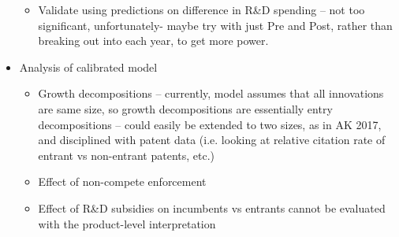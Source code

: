\documentclass[11pt,english]{article}
\theoremstyle{remark}
\begin{document}
\begin{itemize}
\begin{itemize}
		\item Validate using predictions on difference in R\&D spending -- not too significant, unfortunately- maybe try with just Pre and Post, rather than breaking out into each year, to get more power.
	\end{itemize}
	\item Analysis of calibrated model
	\begin{itemize}
		\item Growth decompositions -- currently, model assumes that all innovations are same size, so growth decompositions are essentially entry decompositions -- could easily be extended to two sizes, as in AK 2017, and disciplined with patent data (i.e. looking at relative citation rate of entrant vs non-entrant patents, etc.)
		\item Effect of non-compete enforcement
		\item Effect of R\&D subsidies on incumbents vs entrants cannot be evaluated with the product-level interpretation
	\end{itemize}
\end{itemize}
\end{document}
